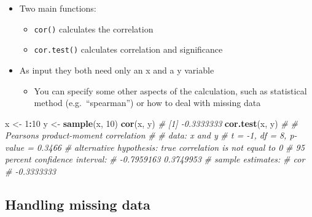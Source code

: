 \documentclass[
]{book}
\newenvironment{Shaded}{\begin{snugshade}}{\end{snugshade}}
\newcommand{\CommentTok}[1]{\textcolor[rgb]{0.56,0.35,0.01}{\textit{#1}}}
\newcommand{\DecValTok}[1]{\textcolor[rgb]{0.00,0.00,0.81}{#1}}
\newcommand{\FunctionTok}[1]{\textcolor[rgb]{0.13,0.29,0.53}{\textbf{#1}}}
\newcommand{\NormalTok}[1]{#1}
\newcommand{\OtherTok}[1]{\textcolor[rgb]{0.56,0.35,0.01}{#1}}
\newcommand{\SpecialCharTok}[1]{\textcolor[rgb]{0.81,0.36,0.00}{\textbf{#1}}}
\providecommand{\tightlist}{%
  \setlength{\itemsep}{0pt}\setlength{\parskip}{0pt}}
\begin{document}
\begin{itemize}
\tightlist
\item
  Two main functions:

  \begin{itemize}
  \tightlist
  \item
    \texttt{cor()} calculates the correlation
  \item
    \texttt{cor.test()} calculates correlation and significance
  \end{itemize}
\item
  As input they both need only an x and a y variable

  \begin{itemize}
  \tightlist
  \item
    You can specify some other aspects of the calculation, such as statistical method (e.g.~``spearman'') or how to deal with missing data
  \end{itemize}
\end{itemize}

\begin{Shaded}
\begin{Highlighting}[]
\NormalTok{x }\OtherTok{\textless{}{-}} \DecValTok{1}\SpecialCharTok{:}\DecValTok{10} 
\NormalTok{y }\OtherTok{\textless{}{-}} \FunctionTok{sample}\NormalTok{(x, }\DecValTok{10}\NormalTok{)}
\FunctionTok{cor}\NormalTok{(x, y)}
\CommentTok{\# [1] {-}0.3333333}
\FunctionTok{cor.test}\NormalTok{(x, y)}
\CommentTok{\# }
\CommentTok{\#   Pearson\textquotesingle{}s product{-}moment correlation}
\CommentTok{\# }
\CommentTok{\# data:  x and y}
\CommentTok{\# t = {-}1, df = 8, p{-}value = 0.3466}
\CommentTok{\# alternative hypothesis: true correlation is not equal to 0}
\CommentTok{\# 95 percent confidence interval:}
\CommentTok{\#  {-}0.7959163  0.3749953}
\CommentTok{\# sample estimates:}
\CommentTok{\#        cor }
\CommentTok{\# {-}0.3333333}
\end{Highlighting}
\end{Shaded}

\subsection{Handling missing data}\label{handling-missing-data}
\end{document}
